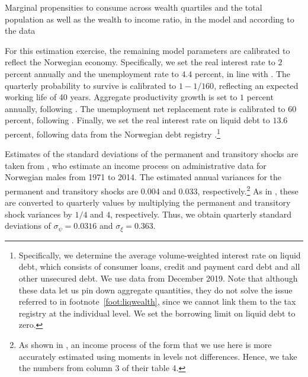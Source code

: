 \documentclass[\econtexRoot/HAFiscal]{subfiles}
\begin{document}

\begin{table}[t]
  \center
  
  \caption{Marginal propensities to consume across wealth quartiles and the total population as well as the wealth to income ratio, in the model and according to the data}
  \notinsubfile{\label{tab:MPC_WQ}}
\end{table}


For this estimation exercise, the remaining model parameters are calibrated to reflect the Norwegian economy.
Specifically, we set the real interest rate to $2$ percent annually and the unemployment rate to $4.4$ percent, in line with \citet{aursland_state-dependent_2020}.
The quarterly probability to survive is calibrated to $1-1/160$, reflecting an expected working life of 40 years.
Aggregate productivity growth is set to $1$ percent annually, following \citet{kravik_navigating_2019}.
The unemployment net replacement rate is calibrated to $60$ percent, following \citet{oecd_net_2020}.
Finally, we set the real interest rate on liquid debt to $13.6$ percent, following data from the Norwegian debt registry \citet{gjeldsregistret_nokkeltall_2022}.\footnote{Specifically, we determine the average volume-weighted interest rate on liquid debt, which consists of consumer loans, credit and payment card debt and all other unsecured debt.
We use data from December 2019.
Note that although these data let us pin down aggregate quantities, they do not solve the issue referred to in footnote~\ref{foot:liqwealth}, since we cannot link them to the tax registry at the individual level.
We set the borrowing limit on liquid debt to zero.}

Estimates of the standard deviations of the permanent and transitory shocks are taken from \citet{crawley2022parsimonious}, who estimate an income process on administrative data for Norwegian males from 1971 to 2014.
The estimated annual variances for the permanent and transitory shocks are 0.004 and 0.033, respectively.\footnote{As shown in \citet{crawley2022parsimonious}, an income process of the form that we use here is more accurately estimated using moments in levels not differences.
Hence, we take the numbers from column 3 of their table 4.} As in \citet{carroll2020sticky}, these are converted to quarterly values by multiplying the permanent and transitory shock variances by $1/4$ and $4$, respectively.
Thus, we obtain quarterly standard deviations of $\sigma_\psi=0.0316$ and $\sigma_\xi=0.363$.
\end{document}

